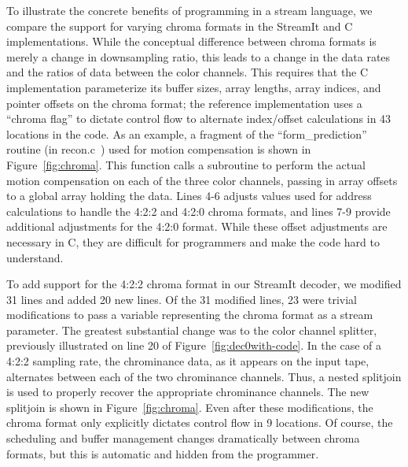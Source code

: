 \label{section:chroma}

To illustrate the concrete benefits of programming in a stream
language, we compare the support for varying chroma formats in the
StreamIt and C implementations.  While the conceptual difference
between chroma formats is merely a change in downsampling ratio, this
leads to a change in the data rates and the ratios of data between the
color channels. This requires that the C implementation parameterize
its buffer sizes, array lengths, array indices, and pointer offsets on
the chroma format; the reference implementation uses a ``chroma flag''
to dictate control flow to alternate index/offset calculations in 43
locations in the code. As an example, a fragment of the
``form\_prediction'' routine (in recon.c~\cite{reference-mpeg-c}) used
for motion compensation is shown in Figure~\ref{fig:chroma}. This
function calls a subroutine to perform the actual motion compensation
on each of the three color channels, passing in array offsets to a
global array holding the data. Lines 4-6 adjusts values used for
address calculations to handle the 4:2:2 and 4:2:0 chroma formats, and
lines 7-9 provide additional adjustments for the 4:2:0 format. While
these offset adjustments are necessary in C, they are difficult for
programmers and make the code hard to understand.

To add support for the 4:2:2 chroma format in our StreamIt decoder, we
modified 31 lines and added 20 new lines. Of the 31 modified lines, 23
were trivial modifications to pass a variable representing the chroma
format as a stream parameter. The greatest substantial change was to
the color channel splitter, previously illustrated on line 20 of
Figure~\ref{fig:dec0with-code}. In the case of a 4:2:2 sampling
rate, the chrominance data, as it appears on the input tape,
alternates between each of the two chrominance channels. Thus, a
nested splitjoin is used to properly recover the appropriate
chrominance channels. The new splitjoin is shown in
Figure~\ref{fig:chroma}.  Even after these modifications, the chroma
format only explicitly dictates control flow in 9 locations. Of
course, the scheduling and buffer management changes dramatically
between chroma formats, but this is automatic and hidden from the
programmer.


